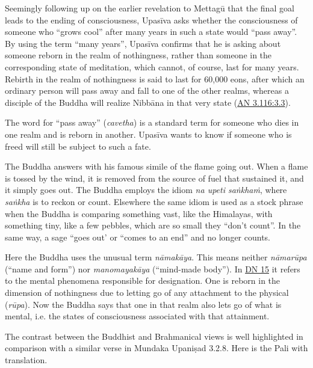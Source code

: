 \documentclass[12pt,openany]{book}%
\begin{document}
Seemingly following up on the earlier revelation to \textsanskrit{Mettagū} that the final goal leads to the ending of consciousness, \textsanskrit{Upasīva} asks whether the consciousness of someone who “grows cool” after many years in such a state would “pass away”. By using the term “many years”, \textsanskrit{Upasīva} confirms that he is asking about someone reborn in the realm of nothingness, rather than someone in the corresponding state of meditation, which cannot, of course, last for many years. Rebirth in the realm of nothingness is said to last for 60,000 eons, after which an ordinary person will pass away and fall to one of the other realms, whereas a disciple of the Buddha will realize \textsanskrit{Nibbāna} in that very state (\href{https://suttacentral.net/an3.116/en/sujato\#3.3}{AN 3.116:3.3}).

The word for “pass away” (\textit{cavetha}) is a standard term for someone who dies in one realm and is reborn in another. \textsanskrit{Upasīva} wants to know if someone who is freed will still be subject to such a fate.

The Buddha answers with his famous simile of the flame going out. When a flame is tossed by the wind, it is removed from the source of fuel that sustained it, and it simply goes out. The Buddha employs the idiom \textit{na upeti \textsanskrit{saṅkhaṁ}}, where \textit{\textsanskrit{saṅkha}} is to reckon or count. Elsewhere the same idiom is used as a stock phrase when the Buddha is comparing something vast, like the Himalayas, with something tiny, like a few pebbles, which are so small they “don’t count”. In the same way, a sage “goes out’ or “comes to an end” and no longer counts.

Here the Buddha uses the unusual term \textit{\textsanskrit{nāmakāya}}. This means neither \textit{\textsanskrit{nāmarūpa}} (“name and form”) nor \textit{\textsanskrit{manomayakāya}} (“mind-made body”). In \href{https://suttacentral.net/dn15/en/sujato}{DN 15} it refers to the mental phenomena responsible for designation. One is reborn in the dimension of nothingness due to letting go of any attachment to the physical (\textit{\textsanskrit{rūpa}}). Now the Buddha says that one in that realm also lets go of what is mental, i.e. the states of consciousness associated with that attainment.

The contrast between the Buddhist and Brahmanical views is well highlighted in comparison with a similar verse in Mundaka \textsanskrit{Upaniṣad} 3.2.8. Here is the Pali with translation.
\end{document}
